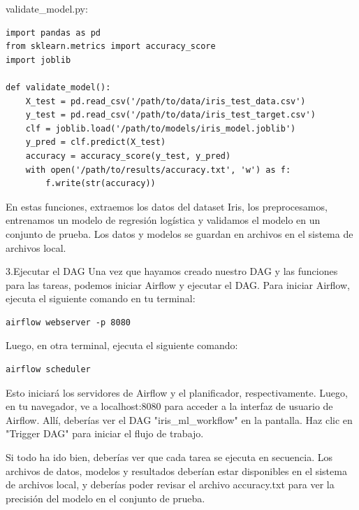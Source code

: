 \documentclass[11pt]{article}
\begin{document}
validate\_model.py:
\begin{verbatim}
import pandas as pd
from sklearn.metrics import accuracy_score
import joblib

def validate_model():
    X_test = pd.read_csv('/path/to/data/iris_test_data.csv')
    y_test = pd.read_csv('/path/to/data/iris_test_target.csv')
    clf = joblib.load('/path/to/models/iris_model.joblib')
    y_pred = clf.predict(X_test)
    accuracy = accuracy_score(y_test, y_pred)
    with open('/path/to/results/accuracy.txt', 'w') as f:
        f.write(str(accuracy))

\end{verbatim}
En estas funciones, extraemos los datos del dataset Iris, los
preprocesamos, entrenamos un modelo de regresión logística y validamos
el modelo en un conjunto de prueba. Los datos y modelos se guardan en
archivos en el sistema de archivos local.

3.Ejecutar el DAG Una vez que hayamos creado nuestro DAG y las
funciones para las tareas, podemos iniciar Airflow y ejecutar el
DAG. Para iniciar Airflow, ejecuta el siguiente comando en tu
terminal:

\begin{verbatim}
airflow webserver -p 8080
\end{verbatim}

Luego, en otra terminal, ejecuta el siguiente comando:

\begin{verbatim}
airflow scheduler
\end{verbatim}

Esto iniciará los servidores de Airflow y el planificador,
respectivamente. Luego, en tu navegador, ve a localhost:8080 para
acceder a la interfaz de usuario de Airflow. Allí, deberías ver el DAG
"iris\_ml\_workflow" en la pantalla. Haz clic en "Trigger DAG" para
iniciar el flujo de trabajo.

Si todo ha ido bien, deberías ver que cada tarea se ejecuta en
secuencia. Los archivos de datos, modelos y resultados deberían estar
disponibles en el sistema de archivos local, y deberías poder revisar
el archivo accuracy.txt para ver la precisión del modelo en el
conjunto de prueba.
\end{document}
